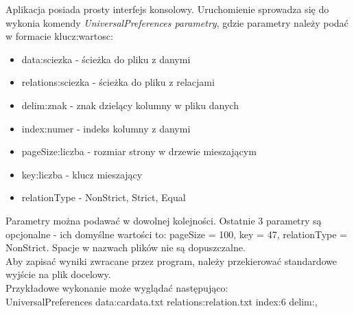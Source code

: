 \documentclass[a4paper,12pt]{article}
\begin{document}
Aplikacja posiada prosty interfejs konsolowy. Uruchomienie sprowadza się do wykonia komendy \textit{UniversalPreferences parametry}, gdzie parametry należy podać w formacie klucz:wartosc:

\begin{itemize}
\item data:sciezka - ścieżka do pliku z danymi
\item relations:sciezka - ścieżka do pliku z relacjami
\item delim:znak - znak dzielący kolumny w pliku danych
\item index:numer - indeks kolumny z danymi
\item pageSize:liczba - rozmiar strony w drzewie mieszającym
\item key:liczba - klucz mieszający
\item relationType - {NonStrict, Strict, Equal}
\end{itemize}

Parametry można podawać w dowolnej kolejności. Ostatnie 3 parametry są opcjonalne - ich domyślne wartości to: pageSize = 100, key = 47, relationType = NonStrict. Spacje w nazwach plików nie są dopuszczalne.\\

Aby zapisać wyniki zwracane przez program, należy przekierować standardowe wyjście na plik docelowy.\\

Przykładowe wykonanie może wyglądać następująco:\\

UniversalPreferences data:cardata.txt relations:relation.txt index:6 delim:,




\end{document}
